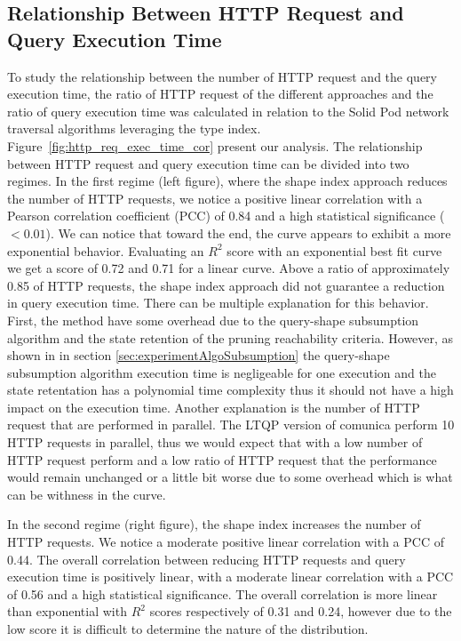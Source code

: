 \subsection{Relationship Between HTTP Request and Query Execution Time}


To study the relationship between the number of HTTP request and the query execution time, the ratio of HTTP request of the different approaches and the ratio of query execution time was 
calculated in relation to the Solid Pod network traversal algorithms leveraging the type index.
Figure~\ref{fig:http_req_exec_time_cor} present our analysis.
The relationship between HTTP request and query execution time can be divided into two regimes.
In the first regime (left figure), where the shape index approach reduces the number of HTTP requests, we notice a positive linear correlation with a Pearson correlation coefficient (PCC) of 0.84 and a high statistical significance ($< 0.01$).
We can notice that toward the end, the curve appears to exhibit a more exponential behavior.
Evaluating an $R^2$ score with an exponential best fit curve we get a score of 0.72 and 0.71 for a linear curve.
Above a ratio of approximately 0.85 of HTTP requests, the shape index approach did not guarantee a reduction in query execution time.
There can be multiple explanation for this behavior.
First, the method have some overhead due to the query-shape subsumption algorithm and the state retention of the pruning reachability criteria.
However, as shown in in section \ref{sec:experimentAlgoSubsumption} the query-shape subsumption algorithm execution time is negligeable for one execution and the state retentation has a polynomial time complexity thus it should not have a high impact on the execution time.
Another explanation is the number of HTTP request that are performed in parallel.
The LTQP version of comunica perform 10 HTTP requests in parallel, thus we would expect that with a low number of HTTP request perform and a low ratio of HTTP request that the performance would remain unchanged or a little bit worse due to some overhead which is what 
can be withness in the curve.

In the second regime (right figure), the shape index increases the number of HTTP requests.
We notice a moderate positive linear correlation with a PCC of 0.44.
The overall correlation between reducing HTTP requests and query execution time is positively linear, with a moderate linear correlation with a PCC of 0.56 and a high statistical significance.
The overall correlation is more linear than exponential with $R^2$ scores respectively of 0.31 and 0.24, however due to the low score it is difficult to determine the nature of the distribution.


